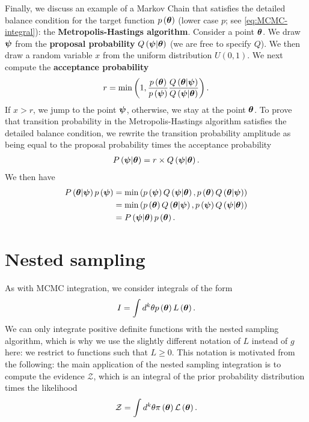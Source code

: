 Finally, we discuss an example of a Markov Chain that satisfies 
the detailed balance
condition for the target function $p\left({\bm \theta}\right)$
(lower case $p$; see \eqref{eq:MCMC-integral}):
the \textbf{Metropolis-Hastings algorithm}.
Consider a point ${\bm \theta}$.
We draw ${\bm \psi}$ from the \textbf{proposal probability} $Q\left({\bm \psi}|{\bm \theta}\right)$
(we are free to specify $Q$).
We then draw a random variable $x$ from the uniform distribution $U\left(0,1\right)$. We next compute the \textbf{acceptance probability} 
\begin{align}
    \label{eq:metropolis-p}
    r 
    =
    \min\left(
        1,
        \frac{p\left({\bm \theta}\right)}{p\left({\bm \psi}\right)}
        \frac{Q\left({\bm \theta}|{\bm \psi}\right)}{Q\left({\bm \psi}|{\bm \theta}\right)}
    \right)
    .
\end{align}
If $x>r$, we jump to the point ${\bm \psi}$, otherwise, we stay at the point ${\bm \theta}$.
To prove that transition probability in the 
Metropolis-Hastings algorithm satisfies the detailed balance condition, 
we rewrite the transition probability amplitude as being equal to
the proposal probability times the acceptance probability
\begin{align}
    P\left({\bm \psi}|{\bm \theta}\right)
    =
    r \times Q\left({\bm \psi}|{\bm \theta}\right)
    .
\end{align}
We then have
\begin{align}
    P\left({\bm \theta}|{\bm \psi}\right)p\left({\bm \psi}\right)
    &=
    \min\left(
        p\left({\bm \psi}\right)Q\left({\bm \psi}|{\bm \theta}\right)
        ,
        p\left({\bm \theta}\right)Q\left({\bm \theta}|{\bm \psi}\right)
    \right)
    \nonumber\\
    &=
    \min\left(
        p\left({\bm \theta}\right)Q\left({\bm \theta}|{\bm \psi}\right)
        ,
        p\left({\bm \psi}\right)Q\left({\bm \psi}|{\bm \theta}\right)
    \right)
    \nonumber\\
    &=
    P\left({\bm \psi}|{\bm \theta}\right)p\left({\bm \theta}\right)
    .
\end{align}

\section{Nested sampling\label{sec:nested-sampling}}

As with MCMC integration, we consider integrals of the form
\begin{align}
    \label{eq:integral-nested-ptheta}
    I
    =
    \int d^k\theta p\left({\bm \theta}\right) L\left({\bm \theta}\right)
    .
\end{align}
We can only integrate positive definite functions with the nested sampling algorithm, 
which is why we use the slightly different notation of $L$ instead of $g$ here: 
we restrict to functions such that $L\geq0$.
This notation is motivated from the following:
the main application of the nested sampling integration is to compute the evidence 
$\mathcal{Z}$,
which is an integral of the prior probability distribution times the likelihood
\begin{align}
    \mathcal{Z}
    =
    \int d^k\theta \pi\left({\bm \theta}\right) \mathcal{L}\left({\bm \theta}\right)
    .
\end{align}

